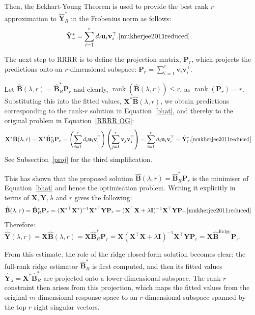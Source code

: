 \documentclass[11pt]{report} %
\begin{document}
Then, the Eckhart-Young Theorem is used to provide the best rank \( r \) approximation to \( \hat{\mathbf{Y}}^*_R \) in the Frobenius norm as follows:
\[
\hat{\mathbf{Y}}^*_r = \sum_{i=1}^{r} d_i \mathbf{u}_i \mathbf{v}_i^\top.\cite{mukherjee2011reduced}
\]

The next step to RRRR is to define the projection matrix, $\mathbf{P}_r$, which projects the predictions onto an $r$-dimensional subspace: \( \mathbf{P}_r = \sum_{i=1}^{r} \mathbf{v}_i \mathbf{v}_i^\top \).

Let \( \hat{\mathbf{B}}(\lambda, r) = \hat{\mathbf{B}}^*_R \mathbf{P}_r \) and  clearly, \(\operatorname{rank}(\hat{\mathbf{B}}(\lambda, r)) \leq r\), as \(\operatorname{rank}(\mathbf{P}_r) = r\).\cite{mukherjee2011reduced} Substituting this into the fitted values, $\mathbf{X}^* \hat{\mathbf{B}}(\lambda, r)$, we obtain predictions corresponding to the rank-$r$ solution in Equation~\ref{bhat}, and thereby to the original problem in Equation~\ref{RRRR OG}:
\[
\mathbf{X}^* \hat{\mathbf{B}}(\lambda, r) = \mathbf{X}^* \hat{\mathbf{B}}^*_R \mathbf{P}_r
= \left( \sum_{i=1}^{\tau} d_i \mathbf{u}_i \mathbf{v}_i^\top \right)
\left( \sum_{j=1}^{r} \mathbf{v}_j \mathbf{v}_j^\top \right)
= \sum_{i=1}^{r} d_i \mathbf{u}_i \mathbf{v}_i^\top = \hat{\mathbf{Y}}^*_r.\cite{mukherjee2011reduced}
\]
See Subsection~\ref{proj} for the third simplification.

This has shown that the proposed solution \( \hat{\mathbf{B}}(\lambda, r) = \hat{\mathbf{B}}^*_R \mathbf{P}_r \) is the minimiser of Equation~\ref{bhat} and hence the optimisation problem.\cite{mukherjee2011reduced} Writing it explicitly in terms of \( \mathbf{X}, \mathbf{Y}, \lambda \) and \( r \) gives the following:
\[
\hat{\mathbf{B}}(\lambda, r) = \hat{\mathbf{B}}^*_R \mathbf{P}_r = (\mathbf{X}^{*\top} \mathbf{X}^*)^{-1} \mathbf{X}^{*\top} \mathbf{Y} \mathbf{P}_r
= (\mathbf{X}^\top \mathbf{X} + \lambda \mathbf{I})^{-1} \mathbf{X}^\top \mathbf{Y} \mathbf{P}_r.\cite{mukherjee2011reduced}
\]
Therefore:
\(\hat{\mathbf{Y}}(\lambda, r) = \mathbf{X}\hat{\mathbf{B}}(\lambda, r) =\mathbf{X}\hat{\mathbf{B}}^*_R \mathbf{P}_r= \mathbf{X} \left( \mathbf{X}^\top \mathbf{X} + \lambda \mathbf{I} \right)^{-1} \mathbf{X}^\top \mathbf{Y} \mathbf{P}_r = {\mathbf{X}}\hat{\mathbf{B}}^\text{Ridge} \mathbf{P}_r.\)

From this estimate, the role of the ridge closed-form solution becomes clear: the full-rank ridge estimator $\hat{\mathbf{B}}^*_R$ is first computed, and then its fitted values $\hat{\mathbf{Y}}_\lambda = \mathbf{X}^* \hat{\mathbf{B}}^*_R$ are projected onto a lower-dimensional subspace. The rank-$r$ constraint then arises from this projection, which maps the fitted values from the original $m$-dimensional response space to an $r$-dimensional subspace spanned by the top $r$ right singular vectors.
\end{document}
